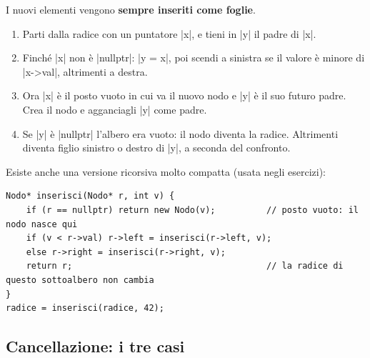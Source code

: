 \begin{passopasso}
I nuovi elementi vengono \textbf{sempre inseriti come foglie}.
\begin{enumerate}
  \item Parti dalla radice con un puntatore \cc|x|, e tieni in \cc|y| il padre di \cc|x|.
  \item Finché \cc|x| non è \cc|nullptr|: \cc|y = x|, poi scendi a sinistra se il
        valore è minore di \cc|x->val|, altrimenti a destra.
  \item Ora \cc|x| è il posto vuoto in cui va il nuovo nodo e \cc|y| è il suo futuro
        padre. Crea il nodo e agganciagli \cc|y| come padre.
  \item Se \cc|y| è \cc|nullptr| l'albero era vuoto: il nodo diventa la radice.
        Altrimenti diventa figlio sinistro o destro di \cc|y|, a seconda del confronto.
\end{enumerate}
\end{passopasso}
Esiste anche una versione ricorsiva molto compatta (usata negli esercizi):
\begin{lstlisting}
Nodo* inserisci(Nodo* r, int v) {
    if (r == nullptr) return new Nodo(v);          // posto vuoto: il nodo nasce qui
    if (v < r->val) r->left = inserisci(r->left, v);
    else r->right = inserisci(r->right, v);
    return r;                                      // la radice di questo sottoalbero non cambia
}
radice = inserisci(radice, 42);
\end{lstlisting}

\subsection*{Cancellazione: i tre casi}

